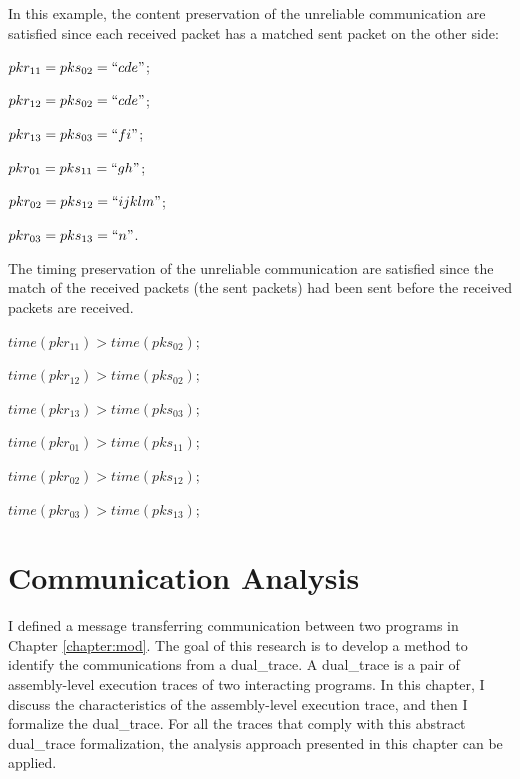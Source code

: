 \documentclass[12pt,oneside]{book}
\newcommand\startchapter[1]{\chapter{#1}\thispagestyle{myheadings}}
\begin{document}
In this example, the content preservation of the unreliable communication are satisfied since each received packet has a matched sent packet on the other side:

$pkr_{11} = pks_{02}=``cde"$; 

$pkr_{12} = pks_{02}=``cde"$;

$pkr_{13} = pks_{03}=``fi"$;

$pkr_{01} = pks_{11}=``gh"$;

$pkr_{02} = pks_{12}=``ijklm"$;

$pkr_{03} = pks_{13}=``n"$.

The timing preservation of the unreliable communication are satisfied since the match of the received packets (the sent packets) had been sent before the received packets are received.

$time(pkr_{11}) > time(pks_{02})$;

$time(pkr_{12}) > time(pks_{02})$; 

$time(pkr_{13}) > time(pks_{03})$;

$time(pkr_{01}) > time(pks_{11})$;

$time(pkr_{02}) > time(pks_{12})$;

$time(pkr_{03}) > time(pks_{13})$;





    


\startchapter{Communication Analysis}
\label{chapter:alo}
I defined a message transferring communication between two programs in Chapter \ref{chapter:mod}. The goal of this research is to develop a method to identify the communications from a dual\_trace. A dual\_trace is a pair of assembly-level execution traces of two interacting programs. In this chapter, I discuss the characteristics of the assembly-level execution trace, and then I formalize the dual\_trace. For all the traces that comply with this abstract dual\_trace formalization, the analysis approach presented in this chapter can be applied.
\end{document}
